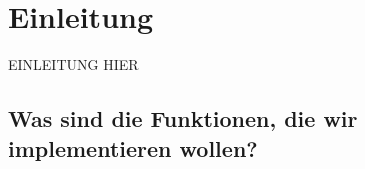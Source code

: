 \section{Einleitung}

\begin{frame}{}{}
    EINLEITUNG HIER
\end{frame}

\subsection[nötige Funktionen]{Was sind die Funktionen, die wir implementieren wollen?}

